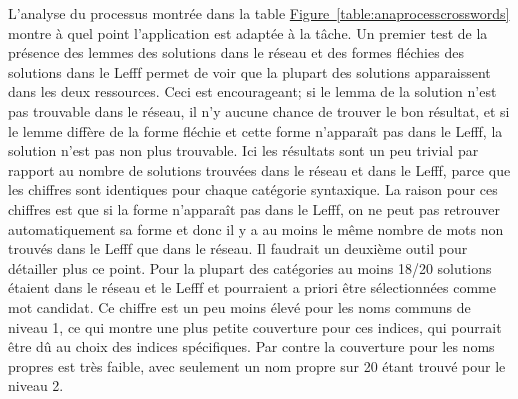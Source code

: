 L'analyse du processus montrée dans la table \hyperref[table:anaprocesscrosswords]{Figure~\ref*{table:anaprocesscrosswords}} montre à quel point l'application est adaptée à la tâche. Un premier test de la présence des lemmes des solutions dans le réseau et des formes fléchies des solutions dans le Lefff permet de voir que la plupart des solutions apparaissent dans les deux ressources. Ceci est encourageant; si le lemma de la solution n'est pas trouvable dans le réseau, il n'y aucune chance de trouver le bon résultat, et si le lemme diffère de la forme fléchie et cette forme n'apparaît pas dans le Lefff, la solution n'est pas non plus trouvable. Ici les résultats sont un peu trivial par rapport au nombre de solutions trouvées dans le réseau et dans le Lefff, parce que les chiffres sont identiques pour chaque catégorie syntaxique. La raison pour ces chiffres est que si la forme n'apparaît pas dans le Lefff, on ne peut pas retrouver automatiquement sa forme et donc il y a au moins le même nombre de mots non trouvés dans le Lefff que dans le réseau. Il faudrait un deuxième outil pour détailler plus ce point. Pour la plupart des catégories au moins 18/20 solutions étaient dans le réseau et le Lefff et pourraient a priori être sélectionnées comme mot candidat. Ce chiffre est un peu moins élevé pour les noms communs de niveau 1, ce qui montre une plus petite couverture pour ces indices, qui pourrait être dû au choix des indices spécifiques. Par contre la couverture pour les noms propres est très faible, avec seulement un nom propre sur 20 étant trouvé pour le niveau 2.


